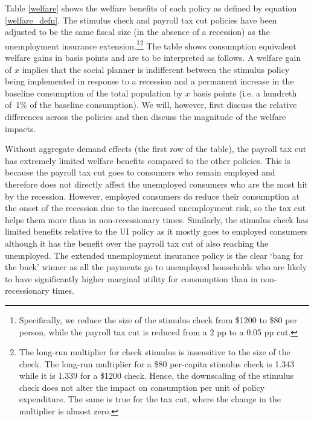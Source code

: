 \documentclass[../HAFiscal]{subfiles}
\begin{document}
Table \ref{welfare} shows the welfare benefits of each policy as defined by equation \eqref{welfare_defn}. The stimulus check and payroll tax cut policies have been adjusted to be the same fiscal size (in the absence of a recession) as the unemployment insurance extension.\footnote{Specifically, we reduce the size of the stimulus check from \$1200 to \$80 per person, while the payroll tax cut is reduced from a 2 pp to a 0.05 pp cut.}\footnote{The long-run multiplier for check stimulus is insensitive to the size of the check. The long-run multiplier for a \$80 per-capita stimulus check is 1.343 while it is 1.339 for a \$1200 check. Hence, the downscaling of the stimulus check does not alter the impact on consumption per unit of policy expenditure. The same is true for the tax cut, where the change in the multiplier is almost zero.} The table shows consumption equivalent welfare gains in basis points and are to be interpreted as follows. A welfare gain of $x$ implies that the social planner is indifferent between the stimulus policy being implemented in response to a recession and a permanent increase in the baseline consumption of the total population by $x$ basis points (i.e. a hundreth of~1\% of the baseline consumption). We will, however, first discuss the relative differences across the policies and then discuss the magnitude of the welfare impacts.

Without aggregate demand effects (the first row of the table), the payroll tax cut has extremely limited welfare benefits compared to the other policies. This is because the payroll tax cut goes to consumers who remain employed and therefore does not directly affect the unemployed consumers who are the most hit by the recession. However, employed consumers do reduce their consumption at the onset of the recession due to the increased unemployment risk, so the tax cut helps them more than in non-recessionary times. Similarly, the stimulus check has limited benefits relative to the UI policy as it mostly goes to employed consumers although it has the benefit over the payroll tax cut of also reaching the unemployed. The extended unemployment insurance policy is the clear `bang for the buck' winner as all the payments go to unemployed households who are likely to have significantly higher marginal utility for consumption than in non-recessionary times.
\end{document}
